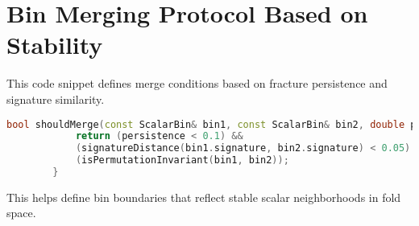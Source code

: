 \documentclass{article}
\begin{document}
	\section{Bin Merging Protocol Based on Stability}
	
	This code snippet defines merge conditions based on fracture persistence and signature similarity.
	
	\begin{lstlisting}[language=C++,caption={Bin Merge Criteria Based on Scalar Stability}]
		bool shouldMerge(const ScalarBin& bin1, const ScalarBin& bin2, double persistence) {
			return (persistence < 0.1) &&
			(signatureDistance(bin1.signature, bin2.signature) < 0.05) &&
			(isPermutationInvariant(bin1, bin2));
		}
	\end{lstlisting}
	
	This helps define bin boundaries that reflect stable scalar neighborhoods in fold space.
	
	
		
		
	
\end{document}
